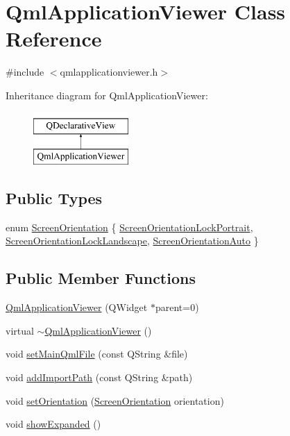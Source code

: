 \hypertarget{classQmlApplicationViewer}{\section{Qml\-Application\-Viewer Class Reference}
\label{classQmlApplicationViewer}
}


{\ttfamily \#include $<$qmlapplicationviewer.\-h$>$}

Inheritance diagram for Qml\-Application\-Viewer\-:\begin{figure}[H]
\begin{center}
\leavevmode
\includegraphics[height=2.000000cm]{classQmlApplicationViewer}
\end{center}
\end{figure}
\subsection*{Public Types}
\begin{DoxyCompactItemize}
\item 
enum \hyperlink{classQmlApplicationViewer_ac7c7e3771e785af566efd57ef319ac0b}{Screen\-Orientation} \{ \hyperlink{classQmlApplicationViewer_ac7c7e3771e785af566efd57ef319ac0baa2654139c60cbef50d0a8c21203b10f0}{Screen\-Orientation\-Lock\-Portrait}, 
\hyperlink{classQmlApplicationViewer_ac7c7e3771e785af566efd57ef319ac0ba7fb4a2bba3f8cd44a3fdd176a9409707}{Screen\-Orientation\-Lock\-Landscape}, 
\hyperlink{classQmlApplicationViewer_ac7c7e3771e785af566efd57ef319ac0ba43562095f1495c509eba50009e4fa8f0}{Screen\-Orientation\-Auto}
 \}
\end{DoxyCompactItemize}
\subsection*{Public Member Functions}
\begin{DoxyCompactItemize}
\item 
\hyperlink{classQmlApplicationViewer_a842902bbd62c77167410fd7676a8227c}{Qml\-Application\-Viewer} (Q\-Widget $\ast$parent=0)
\item 
virtual \hyperlink{classQmlApplicationViewer_ae712368928844f50f7d6ebe6481595e4}{$\sim$\-Qml\-Application\-Viewer} ()
\item 
void \hyperlink{classQmlApplicationViewer_a41240898c2e371e987fad66304f0acaf}{set\-Main\-Qml\-File} (const Q\-String \&file)
\item 
void \hyperlink{classQmlApplicationViewer_ae288e38be0964d47a08382056fe940c8}{add\-Import\-Path} (const Q\-String \&path)
\item 
void \hyperlink{classQmlApplicationViewer_a80f58eb6d6210437a5e788155a865169}{set\-Orientation} (\hyperlink{classQmlApplicationViewer_ac7c7e3771e785af566efd57ef319ac0b}{Screen\-Orientation} orientation)
\item 
void \hyperlink{classQmlApplicationViewer_ad899dc23f1a2c01276ec428db92215b8}{show\-Expanded} ()
\end{DoxyCompactItemize}
